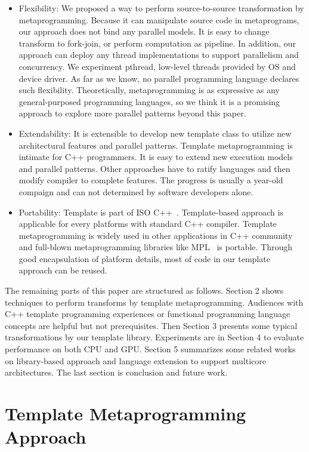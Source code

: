 \documentclass[10pt, conference, compsocconf]{IEEEtran}
\begin{document}
\begin{itemize}
\item Flexibility: We proposed a way to perform source-to-source transformation by
metaprogramming. Because it can manipulate source code in metaprograms,  our approach does not bind any parallel models. It is easy to
change transform to fork-join, or perform computation
as pipeline. In addition, our approach can deploy any thread
implementations to support parallelism and concurrency. We experiment
pthread, low-level threads provided by OS and device driver. As far as we know, no parallel programming language
declares such flexibility. Theoretically, metaprogramming is
as expressive as any general-purposed programming languages, so we
think it is a promising approach to explore more parallel patterns
beyond this paper.

\item Extendability:  It is extensible to develop new template class to
  utilize new architectural features  and parallel patterns. Template
  metaprogramming is intimate for C++ programmers. It is easy to
  extend new execution models and parallel patterns. Other approaches
  have to ratify languages and then modify compiler to complete
  features. The progress is usually a year-old compaign and can not
  determined by software developers alone.

\item Portability: Template is part of ISO C++~\cite{c++03, c++0x}. Template-based approach is applicable for every
  platforms with standard C++ compiler. Template metaprogramming is
  widely used in other applications in C++ community and full-blown
  metaprogramming libraries like
  MPL~\cite{mpl} is portable. Through good encapsulation of
  platform details, most of code in our template approach can be reused.
\end{itemize}

The remaining parts of this paper are structured as follows.
 Section 2 shows techniques to perform
transforms by template metaprogramming. Audiences with C++ template
programming experiences or functional programming language concepts
are helpful but not prerequisites. Then Section 3 presents some
typical transformations by our template library. Experiments are in
Section 4 to evaluate performance on both CPU and GPU.
Section 5 summarizes some related works on library-based approach and
language extension to support multicore architectures.  The last section is conclusion and future work.
\section{Template Metaprogramming Approach}
\end{document}
